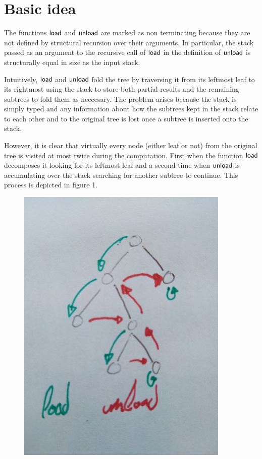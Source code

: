\documentclass[sigplan,10pt,review]{acmart}
\newcommand{\AF}{\AgdaFunction}
\begin{document}
\section{Basic idea}

The functions \ensuremath{\AF{load}} and \ensuremath{\AF{unload}} are marked as non terminating because they are
not defined by structural recursion over their arguments. In particular, the
stack passed as an argument to the recursive call of \ensuremath{\AF{load}} in the definition of
\ensuremath{\AF{unload}} is structurally equal in size as the input stack.

Intuitively, \ensuremath{\AF{load}} and \ensuremath{\AF{unload}} fold the tree by traversing it from its
leftmost leaf to its rightmost using the stack to store both partial results and
the remaining subtrees to fold them as neccesary. The problem arises because the
stack is simply typed and any information about how the subtrees kept in the
stack relate to each other and to the original tree is lost once a subtree is
inserted onto the stack.

However, it is clear that virtually every node (either leaf or not) from the
original tree is visited at most twice during the computation. First when the
function \ensuremath{\AF{load}} decomposes it looking for its leftmost leaf and a second time
when \ensuremath{\AF{unload}} is accumulating over the stack searching for another subtree to
continue. This process is depicted in figure 1.

\begin{figure}[h]
  \includegraphics[scale=0.25]{figure1}
\end{figure}
\end{document}

